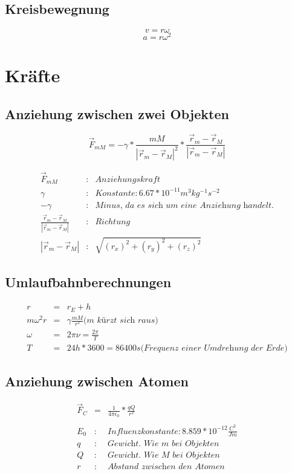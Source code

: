 \documentclass[11pt]{article}
\begin{document}
\subsection{Kreisbewegnung}
$$v = r\omega$$
$$a = r\omega^2$$
\section{Kräfte}
\subsection{Anziehung zwischen zwei Objekten}
$$\overrightarrow{F}_{mM} = -\gamma * \frac{mM}{|\overrightarrow{r}_m-\overrightarrow{r}_M|^2} * \frac{\overrightarrow{r}_m-\overrightarrow{r}_M}{|\overrightarrow{r}_m-\overrightarrow{r}_M|} $$

\begin{eqnarray*}
\overrightarrow{F}_{mM} &:& Anziehungskraft\\
\gamma &:& Konstante:6.67*10^{-11} m^3kg^{-1}s^{-2}\\
-\gamma &:& \textit{Minus, da es sich um eine Anziehung handelt.}\\
\frac{\overrightarrow{r}_m-\overrightarrow{r}_M}{|\overrightarrow{r}_m-\overrightarrow{r}_M|}&:&Richtung\\
|\overrightarrow{r}_m-\overrightarrow{r}_M| &:& \sqrt{(r_x)^2 + (r_y)^2 + (r_z)^2}
\end{eqnarray*}
\subsection{Umlaufbahnberechnungen}
\begin{eqnarray*}
r &=& r_E + h\\
m\omega^2r &=& \gamma\frac{mM}{r^2} \textit{(m kürzt sich raus)}\\
\omega &=& 2\pi\nu = \frac{2\pi}{T}\\
T &=& 24h * 3600 = 86400s \textit{(Frequenz einer Umdrehung der Erde)}
\end{eqnarray*}
\subsection{Anziehung zwischen Atomen}
\begin{eqnarray*}
\overrightarrow{F}_C&=&\frac{1}{4\pi\epsilon_0}*\frac{qQ}{r^2} \\
\\
E_0 &:& Influenzkonstante: 8.859*10^{-12} \frac{C^2}{Jm}\\
q &:& \textit{Gewicht. Wie m bei Objekten}\\
Q &:& \textit{Gewicht. Wie M bei Objekten}\\
r &:& \textit{Abstand zwischen den Atomen}\\
\end{eqnarray*}
\end{document}
